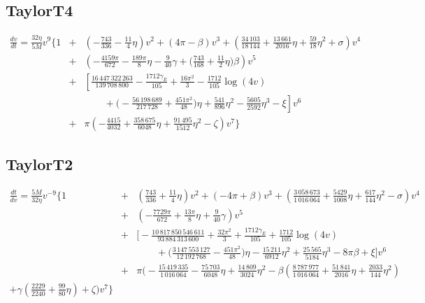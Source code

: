 \subsection{TaylorT4}
\label{app:T4}
\begin{eqnarray} \label{eq:dvdtT4}
\frac{dv}{dt} = \frac{32 \eta}{5 M} v^9 \Bigg\{
1 &+& 
\left( -\frac{743}{336} - \frac{11}{4} \eta \right) v^2
+ (4 \pi - \beta) v^3
+ \left( \frac{34\,103}{18\,144} + \frac{13\,661}{2016} \eta + \frac{59}{18} \eta^2 + \sigma \right) v^4
\nonumber \\
&+& \left( -\frac{4159 \pi}{672} -\frac{189 \pi}{8} \eta - \frac{9}{40} \gamma + \Big(\frac{743}{168} + \frac{11}{2} \eta \Big) \beta \right) v^5
\nonumber \\
&+& \left[ \frac{16\,447\,322\,263}{139\,708\,800} - \frac{1712 \gamma_E}{105} + \frac{16 \pi^2}{3} - \frac{1712}{105} \log (4 v) \right.
\nonumber \\
& & \qquad + \left. \Big(-\frac{56\,198\,689}{217\,728} + \frac{451 \pi ^2}{48} \Big) \eta + \frac{541}{896} \eta^2 - \frac{5605}{2592} \eta^3 - \xi \right] v^6 \nonumber \\
&+& \pi \left( -\frac{4415}{4032} + \frac{358\,675}{6048} \eta + \frac{91\,495}{1512} \eta^2 - \zeta \right) v^7
\Bigg\}
\end{eqnarray}


\subsection{TaylorT2}
\label{app:T2}
\begin{eqnarray}
\frac{dt}{dv} = \frac{5 M}{32 \eta} v^{-9} \Bigg\{
1 &+& 
\left(\frac{743}{336} + \frac{11}{4} \eta \right) v^2
+ \left( -4 \pi + \beta \right) v^3
+ \left( \frac{3\,058\,673}{1\,016\,064} + \frac{5429}{1008} \eta + \frac{617}{144} \eta^2 - \sigma \right) v^4
\nonumber \\
&+& \left( -\frac{7729 \pi}{672} + \frac{13 \pi}{8} \eta + \frac{9}{40} \gamma \right) v^5
\nonumber \\
&+& \Bigg[ -\frac{10\,817\,850\,546\,611}{93\,884\,313\,600} + \frac{32 \pi^2}{3} + \frac{1712 \gamma_E}{105} + \frac{1712}{105} \log (4 v)
\nonumber \\
& & \qquad + \Big(\frac{3\,147\,553\,127}{12\,192\,768} - \frac{451 \pi^2}{48} \Big) \eta - \frac{15\,211}{6912} \eta^2 
+ \frac{25\,565}{5184} \eta^3 - 8 \pi \beta + \xi \Bigg] v^6 \nonumber \\
&+& \pi \Bigg( -\frac{15\,419\,335}{1\,016\,064} -\frac{75\,703}{6048} \eta + \frac{14\,809}{3024} \eta^2 
- \beta \left( \frac{8\,787\,977}{1\,016\,064} + \frac{51\,841}{2016}\eta + \frac{2033}{144}\eta^2 \right) \nonumber \\
 + \gamma \left( \frac{2229}{2240} + \frac{99}{80}\eta \right) + \zeta \Bigg) v^7
\Bigg\}
\end{eqnarray}

